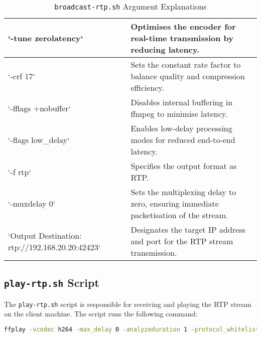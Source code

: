 \begin{table}[!ht]
\begin{tabular}{|p{5cm}|p{10cm}|}
		`-tune zerolatency`                             & Optimises the encoder for real-time transmission by reducing latency.                                                \\ \hline
		`-crf 17`                                       & Sets the constant rate factor to balance quality and compression efficiency.                                         \\ \hline
		`-fflags +nobuffer`                             & Disables internal buffering in ffmpeg to minimise latency.                                                           \\ \hline
		`-flags low\_delay`                             & Enables low-delay processing modes for reduced end-to-end latency.                                                   \\ \hline
		`-f rtp`                                        & Specifies the output format as RTP.                                                                                  \\ \hline
		`-muxdelay 0`                                   & Sets the multiplexing delay to zero, ensuring immediate packetisation of the stream.                                 \\ \hline
		`Output Destination: rtp://192.168.20.20:42423` & Designates the target IP address and port for the RTP stream transmission.                                           \\ \hline
	\end{tabular}
	\caption{\texttt{broadcast-rtp.sh} Argument Explanations}
	\label{tab:broadcast-args}

\end{table}



\subsection{\texttt{play-rtp.sh} Script}

The \texttt{play-rtp.sh} script is responsible for receiving and playing the RTP
stream on the client machine. The script runs the following command:

\begin{lstlisting}[language=bash]
  ffplay -vcodec h264 -max_delay 0 -analyzeduration 1 -protocol_whitelist file,udp,rtp -fflags nobuffer -strict experimental -framedrop -flags low_delay -probesize 32 -vf setpts=0 -sync ext rtp-h264.sdp
 \end{lstlisting}

